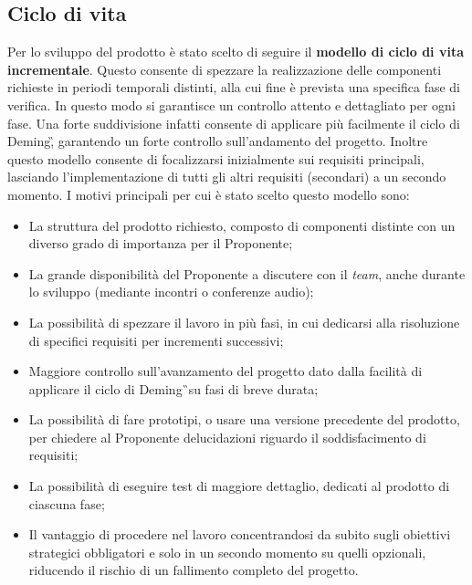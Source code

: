 \subsection{Ciclo di vita}
Per lo sviluppo del prodotto è stato scelto di seguire il \textbf{modello di ciclo di vita incrementale}. Questo consente di spezzare la realizzazione delle componenti richieste in periodi temporali distinti, alla cui fine è prevista una specifica fase di verifica. In questo modo si garantisce un controllo attento e dettagliato per ogni fase. Una forte suddivisione infatti consente di applicare più facilmente il ciclo di Deming\G, garantendo un forte controllo sull'andamento del progetto. Inoltre questo modello consente di focalizzarsi inizialmente sui requisiti principali, lasciando l'implementazione di tutti gli altri requisiti (secondari) a un secondo momento. I motivi principali per cui è stato scelto questo modello sono:
\begin{itemize}
\item La struttura del prodotto richiesto, composto di componenti distinte con un diverso grado di importanza per il Proponente;
\item La grande disponibilità del Proponente a discutere con il \textit{team}, anche durante lo sviluppo (mediante incontri o conferenze audio);
\item La possibilità di spezzare il lavoro in più fasi, in cui dedicarsi alla risoluzione di specifici requisiti per incrementi successivi;
\item Maggiore controllo sull'avanzamento del progetto dato dalla facilità di applicare il ciclo di Deming\G\ su fasi di breve durata;
\item La possibilità di fare prototipi, o usare una versione precedente del prodotto, per chiedere al Proponente delucidazioni riguardo il soddisfacimento di requisiti;
\item La possibilità di eseguire test di maggiore dettaglio, dedicati al prodotto di ciascuna fase;
\item Il vantaggio di procedere nel lavoro concentrandosi da subito sugli obiettivi strategici obbligatori e solo in un secondo momento su quelli opzionali, riducendo il rischio di un fallimento completo del progetto.
\end{itemize}

\newpage